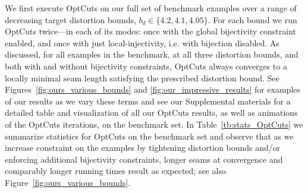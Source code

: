 
We first execute OptCuts on our full set of benchmark examples over a range of decreasing target distortion bounds, $b_d \in \{4.2, 4.1, 4.05\}$. For each bound we run OptCuts twice---in each of its modes: once with the global bijectivity constraint enabled, and once with just local-injectivity, i.e. with bijection disabled. As discussed, for all examples in the benchmark, at all three distortion bounds, and both with and without bijectivity constraints, OptCuts always converges to a locally minimal seam length satisfying the prescribed distortion bound. See Figures\ \ref{fig:ours_various_bounds} and \ref{fig:our_impressive_results} for examples of our results as we vary these terms and see our Supplemental materials for a detailed table and visualization of all our OptCuts results, as well as animations of the OptCuts iterations, on the benchmark set. In Table~\ref{tb:stats_OptCuts} we summarize statistics for OptCuts on the benchmark set and observe that as we increase constraint on the examples by tightening distortion bounds and/or enforcing additional bijectivity constraints, longer seams at convergence and comparably longer running times result as expected; see also Figure~\ref{fig:ours_various_bounds}.




